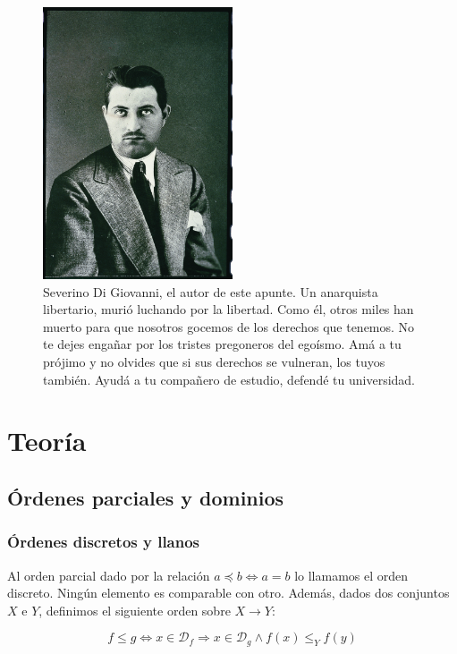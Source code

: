 \documentclass[article, 12pt]{article}
\begin{document}
 \begin{figure}[h!]
 \centering
  \includegraphics[width=0.5\textwidth]{../Images/SeverinoDiGiovanni.jpg}
 \caption{Severino Di Giovanni, el autor de este apunte. Un anarquista
   libertario, murió luchando por la libertad. Como él, otros miles han muerto
   para que nosotros gocemos de los derechos que tenemos. No te dejes engañar
   por los tristes pregoneros del egoísmo. Amá a tu prójimo y no olvides que si
   sus derechos se vulneran, los tuyos también. Ayudá a tu compañero de estudio,
 defendé tu universidad. }
 \end{figure}

\pagebreak
\tableofcontents
\newpage

\section{Teoría}

\subsection{Órdenes parciales y dominios}

\subsubsection{Órdenes discretos y llanos}

Al orden parcial dado por la relación $a \preceq b \iff a = b$ lo llamamos el
orden discreto. Ningún elemento es comparable con otro. Además, dados dos
conjuntos $X$ e $Y$, definimos el
siguiente orden sobre $X \to Y$:

\begin{equation*}
  f \leq g \iff x \in \mathcal{D}_f \Rightarrow x \in \mathcal{D}_g \land
  f(x) \leq_Y f(y)
\end{equation*}
\end{document}
